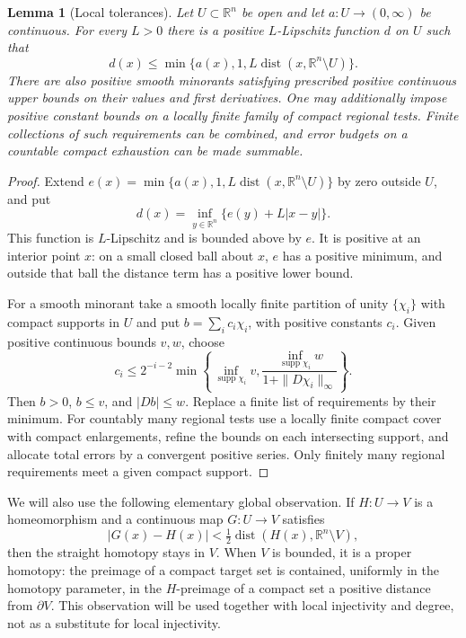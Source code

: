 \documentclass[11pt]{article}
\numberwithin{equation}{section}
\newtheorem{lemma}[theorem]{Lemma}
\theoremstyle{definition}
\theoremstyle{remark}
\begin{document}
\begin{lemma}[Local tolerances]\label{pre:local-tolerances}
Let $U\subset\mathbb R^n$ be open and let $a:U\to(0,\infty)$ be continuous. For every $L>0$ there is a positive $L$-Lipschitz function $d$ on $U$ such that
\[
 d(x)\le \min\{a(x),1,L\operatorname{dist}(x,\mathbb R^n\setminus U)\}.
\]
There are also positive smooth minorants satisfying prescribed positive continuous upper bounds on their values and first derivatives. One may additionally impose positive constant bounds on a locally finite family of compact regional tests. Finite collections of such requirements can be combined, and error budgets on a countable compact exhaustion can be made summable.
\end{lemma}
\begin{proof}
Extend $e(x)=\min\{a(x),1,L\operatorname{dist}(x,\mathbb R^n\setminus U)\}$ by zero outside $U$, and put
\[
 d(x)=\inf_{y\in\mathbb R^n}\{e(y)+L|x-y|\}.
\]
This function is $L$-Lipschitz and is bounded above by $e$. It is positive at an interior point $x$: on a small closed ball about $x$, $e$ has a positive minimum, and outside that ball the distance term has a positive lower bound.

For a smooth minorant take a smooth locally finite partition of unity $\{\chi_i\}$ with compact supports in $U$ and put $b=\sum_i c_i\chi_i$, with positive constants $c_i$. Given positive continuous bounds $v,w$, choose
\[
 c_i\le 2^{-i-2}\min\left\{
 \inf_{\operatorname{supp}\chi_i}v,
 \frac{\inf_{\operatorname{supp}\chi_i}w}{1+\|D\chi_i\|_\infty}
 \right\}.
\]
Then $b>0$, $b\le v$, and $|Db|\le w$. Replace a finite list of requirements by their minimum. For countably many regional tests use a locally finite compact cover with compact enlargements, refine the bounds on each intersecting support, and allocate total errors by a convergent positive series. Only finitely many regional requirements meet a given compact support.
\end{proof}

We will also use the following elementary global observation. If $H:U\to V$ is a homeomorphism and a continuous map $G:U\to V$ satisfies
\[
 |G(x)-H(x)|<\tfrac12\operatorname{dist}(H(x),\mathbb R^n\setminus V),
\]
then the straight homotopy stays in $V$. When $V$ is bounded, it is a proper homotopy: the preimage of a compact target set is contained, uniformly in the homotopy parameter, in the $H$-preimage of a compact set a positive distance from $\partial V$. This observation will be used together with local injectivity and degree, not as a substitute for local injectivity.
\end{document}
